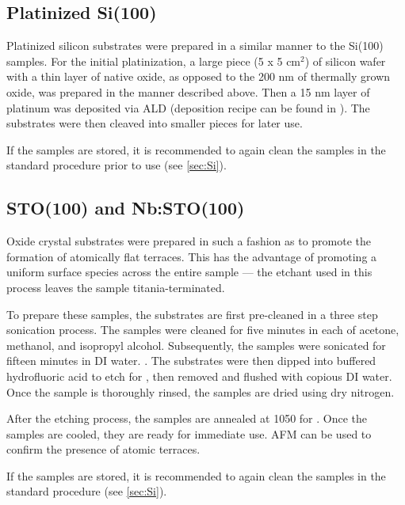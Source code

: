 
\subsection{Platinized Si(100)}

Platinized silicon substrates were prepared in a similar manner to the Si(100) samples. For the initial platinization, a large piece (5 x 5 cm$^{2}$) of silicon wafer with a thin layer of native oxide, as opposed to the 200 nm of thermally grown oxide, was prepared in the manner described above. Then a 15 nm layer of platinum was deposited via ALD (deposition recipe can be found in ). The substrates were then cleaved into smaller pieces for later use. 

If the samples are stored, it is recommended to again clean the samples in the standard procedure prior to use (see \vref{sec:Si}).


\subsection{STO(100) and Nb:STO(100)}

Oxide crystal substrates were prepared in such a fashion as to promote the formation of atomically flat terraces. This has the advantage of promoting a uniform surface species across the entire sample --- the etchant used in this process leaves the sample titania-terminated. 

To prepare these samples, the substrates are first pre-cleaned in a three step sonication process. The samples were cleaned for five minutes in each of acetone, methanol, and isopropyl alcohol. Subsequently, the samples were sonicated for fifteen minutes in DI water. . The substrates were then dipped into buffered hydrofluoric acid to etch for , then removed and flushed with copious DI water.  Once the sample is thoroughly rinsed, the samples are dried using dry nitrogen. 

After the etching process, the samples are annealed at 1050\degC{} for . Once the samples are cooled, they are ready for immediate use. AFM can be used to confirm the presence of atomic terraces. 

If the samples are stored, it is recommended to again clean the samples in the standard procedure (see \vref{sec:Si}).

